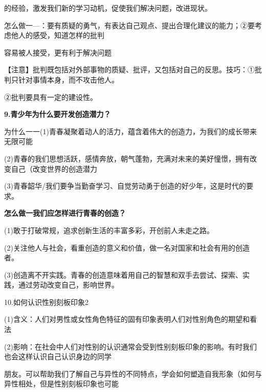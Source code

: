 \documentclass[lang=cn,11pt]{elegantbook}
\newcommand{\daofasym}[1]{{\daofasymbolfont #1}}
\newcommand{\daofasym}[1]{#1}
\begin{document}
的经验，激发我们新的学习动机，促使我们解决问题，改进现状。\par

怎么做一—：要有质疑的勇气，有表达自己观点、提出合理化建议的能力；\daofasym{②}要考虑他人的感受，知道怎样的批判\par

容易被人接受，更有利于解决问题\par

【注意】批判既包括对外部事物的质疑、批评，又包括对自己的反思。技巧：\daofasym{①}批判只针对事情本身，而不攻击他人。\par

\daofasym{②}批判要具有一定的建设性。\par

\textbf{9.青少年为什么要开发创造潜力？}\par

为什么一一(1)青春凝聚着动人的活力，蕴含着伟大的创造力，为我们的成长带来无限可能\par

(2)青春的我们思想活跃，感情奔放，朝气蓬勃，充满对未来的美好憧憬，拥有改变自己（改变世界的创造潜力\par

(3)青春韶华/我们要争当勤奋学习、自觉劳动勇于创造的好少年，这是时代的要求。\par

\textbf{怎么做一我们应怎样进行青春的创造？}\par

(1)敢于打破常规，追求创新生活的丰富多彩，开创前人未走之路。\par

(2)关注他人与社会，看重创造的意义和价值，做一名对国家和社会有用的创造者。\par

(3)创造离不开实践。青春的创造意味着用自己的智慧和双手去尝试、探索、实践，通过劳动改变自己，影响世界。\par

10.如何认识性别刻板印象2\par

(1)含义：人们对男性或女性角色特征的固有印象表明人们对性别角色的期望和看法\par

(2)影响：在社会中人们对性别的认识通常会受到性别刻板印象的影响。有时我们也会这样认识自己认识身边的同学\par

朋友。可以帮助我们了解自己与异性的不同特点，学会如何塑造自我形象（如何与异性相处，但是性别刻板印象也可能\par
\end{document}
